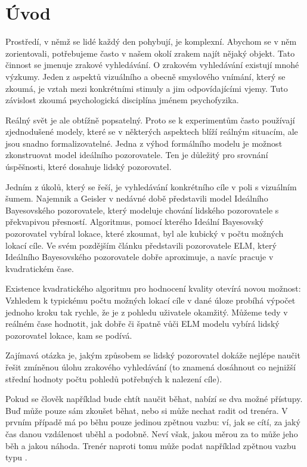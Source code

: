 \chapter*{Úvod}

Prostředí, v němž se lidé každý den pohybují, je komplexní. Abychom se v něm
zorientovali, potřebujeme často v našem okolí zrakem najít nějaký objekt. Tato
činnost se jmenuje zrakové vyhledávání. O zrakovém vyhledávání existují mnohé
výzkumy. Jeden z aspektů vizuálního a obecně smyslového vnímání, který se
zkoumá, je vztah mezi konkrétními stimuly a jim odpovídajícími vjemy. Tuto
závislost zkoumá psychologická disciplína jménem psychofyzika.

Reálný svět je ale obtížně popsatelný. Proto se k experimentům často
používají zjednodušené modely, které se v některých aspektech blíží reálným
situacím, ale jsou snadno formalizovatelné. Jedna z výhod formálního modelu je
možnost zkonstruovat model ideálního pozorovatele. Ten je důležitý pro srovnání
úspěšnosti, které dosahuje lidský pozorovatel.

Jedním z úkolů, který se řeší, je vyhledávání konkrétního cíle v poli s vizuálním šumem.
Najemnik a Geisler \citeyearpar{Najemnik05} v nedávné době představili model
Ideálního Bayesovského pozorovatele, který modeluje chování lidského
pozorovatele s překvapivou přesností. Algoritmus, pomocí kterého Ideální
Bayesovský pozorovatel vybíral lokace, které zkoumat, byl ale kubický v počtu
možných lokací cíle. Ve svém pozdějším článku \citep{Najemnik09} 
představili pozorovatele ELM, který Ideálního Bayesovského pozorovatele dobře
aproximuje, a navíc pracuje v kvadratickém čase.

Existence kvadratického algoritmu pro hodnocení kvality otevírá novou možnost:
Vzhledem k typickému počtu možných lokací cíle v dané úloze probíhá výpočet jednoho kroku
tak rychle, že je z pohledu uživatele okamžitý. Můžeme tedy v reálném
čase hodnotit, jak dobře či špatně vůči ELM modelu vybírá lidský pozorovatel
lokace, kam se podívá.

Zajímavá otázka je, jakým způsobem se lidský pozorovatel dokáže nejlépe naučit
řešit zmíněnou úlohu zrakového vyhledávání (to znamená dosáhnout co nejnižší
střední hodnoty počtu pohledů potřebných k nalezení cíle).

Pokud se člověk například bude chtít naučit běhat, nabízí se dva možné přístupy.
Buď může pouze sám zkoušet běhat, nebo si může nechat radit od trenéra. V prvním
případě má po běhu pouze jedinou zpětnou vazbu: ví, jak se cítí, za jaký čas
danou vzdálenost uběhl a podobně. Neví však, jakou měrou za to může jeho běh a 
jakou náhoda. Trenér naproti tomu může podat například zpětnou vazbu typu .

